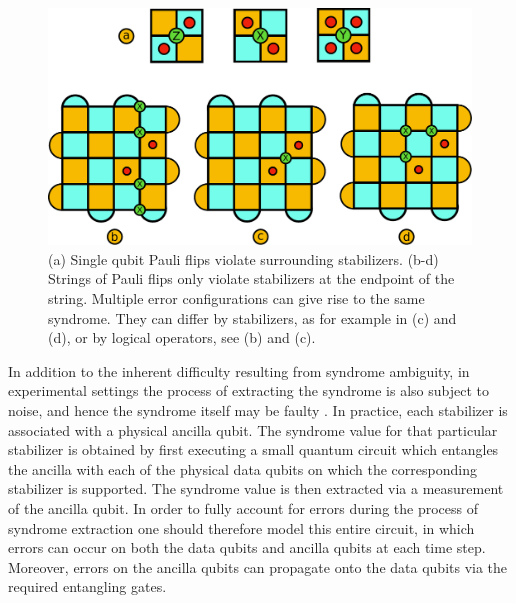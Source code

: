 \documentclass[twocolumn,preprintnumbers,amsmath,amssymb,notitlepage,nofootinbib,longbibliography,superscriptaddress,aps,pra,10pt]{revtex4-1}
\begin{document}
	\begin{figure}
	\centering
	\includegraphics[width=1\linewidth]{figures/surface_code_examples.pdf}
	\caption{
		(a) Single qubit Pauli flips violate surrounding stabilizers.
		(b-d) Strings of Pauli flips only violate stabilizers at the endpoint of the string.
		Multiple error configurations can give rise to the same syndrome.
		They can differ by stabilizers, as for example in (c) and (d), or by logical operators, see (b) and (c).}
		\label{f:surface_code_examples}
	\end{figure}
	In addition to the inherent difficulty resulting from syndrome ambiguity, in experimental settings the process of extracting the syndrome is also subject to noise, and hence the syndrome itself may be faulty \cite{tomita2014low,stephens2014fault}.
	In practice, each stabilizer is associated with a physical ancilla qubit.
	The syndrome value for that particular stabilizer is obtained by first executing a small quantum circuit which entangles the ancilla with each of the physical data qubits on which the corresponding stabilizer is supported.
	The syndrome value is then extracted via a measurement of the ancilla qubit.
	In order to fully account for errors during the process of syndrome extraction one should therefore model this entire circuit, in which errors can occur on both the data qubits and ancilla qubits at each time step.
	Moreover, errors on the ancilla qubits can propagate onto the data qubits via the required entangling gates.
\end{document}

